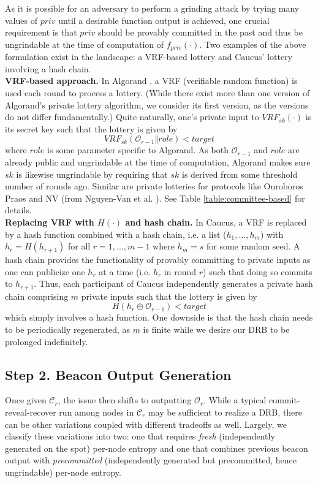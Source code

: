 \documentclass[letterpaper,twocolumn,10pt]{article}
\theoremstyle{definition}
\theoremstyle{remark}
\begin{document}
As it is possible for an adversary to perform a grinding attack by trying many values of $priv$ until a desirable function output is achieved, one crucial requirement is that $priv$ should be provably committed in the past and thus be ungrindable at the time of computation of $f_{priv}(\cdot)$. Two examples of the above formulation exist in the landscape: a VRF-based lottery and Caucus' \cite{azouvi2018winning} lottery involving a hash chain.\\

\noindent\textbf{VRF-based approach.} In Algorand \cite{gilad2017algorand}, a VRF (verifiable random function) \cite{micali1999verifiable,dodis2005verifiable} is used each round to process a lottery. (While there exist more than one version of Algorand's private lottery algorithm, we consider its first version, as the versions do not differ fundamentally.) Quite naturally, one's private input to $VRF_{sk}(\cdot)$ is its secret key such that the lottery is given by
\[
VRF_{sk}(\mathcal{O}_{r - 1} \mathbin\Vert role) < target
\]
where $role$ is some parameter specific to Algorand. As both $\mathcal{O}_{r - 1}$ and $role$ are already public and ungrindable at the time of computation, Algorand makes sure $sk$ is likewise ungrindable by requiring that $sk$ is derived from some threshold number of rounds ago. Similar are private lotteries for protocols like Ouroboros Praos \cite{david2018ouroboros} and NV (from Nguyen-Van et al. \cite{nguyen2019scalable}). See Table \ref{table:committee-based} for details.\\

\noindent\textbf{Replacing VRF with $H(\cdot)$ and hash chain.} In Caucus, a VRF is replaced by a hash function combined with a hash chain, i.e. a list ($h_1, ..., h_m$) with $h_r = H(h_{r + 1})$ for all $r = 1, ..., m - 1$ where $h_m = s$ for some random seed. A hash chain provides the functionality of provably committing to private inputs as one can publicize one $h_r$ at a time (i.e. $h_r$ in round $r$) such that doing so commits to $h_{r + 1}$. Thus, each participant of Caucus independently generates a private hash chain comprising $m$ private inputs such that the lottery is given by
\[
H(h_r \oplus \mathcal{O}_{r - 1}) < target
\]
which simply involves a hash function. One downside is that the hash chain needs to be periodically regenerated, as $m$ is finite while we desire our DRB to be prolonged indefinitely.

\subsection{Step 2. Beacon Output Generation}
\label{subsection:beacon-output-generation}
Once given $\mathcal{C}_r$, the issue then shifts to outputting $\mathcal{O}_r$. While a typical commit-reveal-recover run among nodes in $\mathcal{C}_r$ may be sufficient to realize a DRB, there can be other variations coupled with different tradeoffs as well. Largely, we classify these variations into two: one that requires \textit{fresh} (independently generated on the spot) per-node entropy and one that combines previous beacon output with \textit{precommitted} (independently generated but precommitted, hence ungrindable) per-node entropy.
\end{document}

